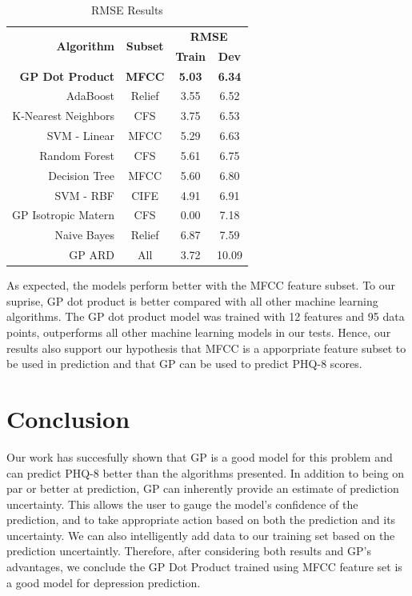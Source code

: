 \documentclass{article}
\begin{document}
	\begin{table}[h!]
		\begin{center}
			\begin{tabular}{ | r | c | c | c | }
			\hline
			\multirow{2}{*}{\bfseries Algorithm}	& \multirow{2}{*}{\bfseries Subset}	& \multicolumn{2}{c|}{\bfseries RMSE} \\\cline{3-4}
									&						& \bfseries Train 	& \bfseries Dev \\ \hline
			\bfseries GP Dot Product  	& \bfseries MFCC  & \bfseries 5.03 & \bfseries 6.34 \\ \hline
			AdaBoost              				& Relief					& 3.55 		& 6.52 \\ \hline
			K-Nearest Neighbors   			& CFS 					& 3.75 		& 6.53 \\ \hline
			SVM - Linear          				& MFCC  					& 5.29 		& 6.63 \\ \hline
			Random Forest         			& CFS   					& 5.61 		& 6.75 \\ \hline
			Decision Tree         				& MFCC  					& 5.60 		& 6.80 \\ \hline
			SVM - RBF             				& CIFE  					& 4.91 		& 6.91 \\ \hline
			GP Isotropic Matern   			& CFS   					& 0.00 		& 7.18 \\ \hline 
			Naive Bayes           				& Relief					& 6.87 		& 7.59 \\ \hline
			GP ARD                				& All   						& 3.72 		& 10.09 \\ \hline

			\end{tabular}
		\end{center}
		\caption{RMSE Results}
		\label{rmse_results}
	\end{table}
	
	As expected, the models perform better with the MFCC feature subset. 
	To our suprise, GP dot product is better compared with all other machine learning algorithms. 
	The GP dot product model was trained with 12 features and 95 data points, outperforms all other machine learning models in our tests. 
	Hence, our results also support our hypothesis that MFCC is a apporpriate feature subset to be used in prediction and that GP can be used to predict PHQ-8 scores.

	\section{Conclusion}	
	Our work has succesfully shown that GP is a good model for this problem and can predict PHQ-8 better than the algorithms presented. 
	In addition to being on par or better at prediction, GP can inherently provide an estimate of prediction uncertainty. This allows the user to gauge the model's 
	confidence of the prediction, and to take appropriate action based on both the prediction and its uncertainty. We can also intelligently add data to our training set based on 
	the prediction uncertaintly. Therefore, after considering both results and GP's advantages, we conclude the GP Dot Product trained using MFCC feature set is a good model for 
	depression prediction.
	
\end{document}
